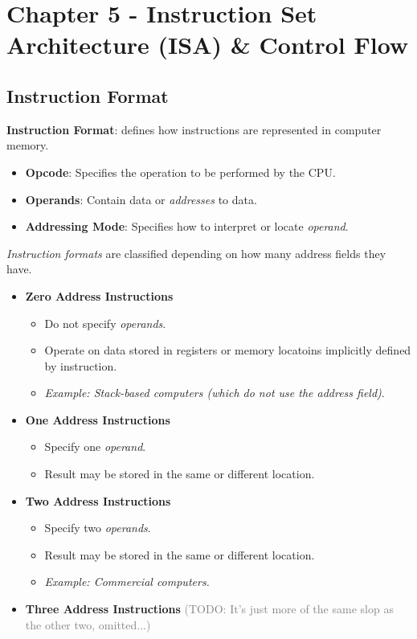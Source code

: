 \documentclass[12pt, letterpaper]{article}
\begin{document}

\section*{Chapter 5 - Instruction Set Architecture (ISA) \& Control Flow}

\subsection*{Instruction Format}

\textbf{Instruction Format}: defines how instructions are represented in computer memory.

\begin{itemize}
    \item \textbf{Opcode}: Specifies the operation to be performed by the CPU.
    \item \textbf{Operands}: Contain data or \textit{addresses} to data.
    \item \textbf{Addressing Mode}: Specifies how to interpret or locate \textit{operand}.
\end{itemize}

\textit{Instruction formats} are classified depending on how many address fields they have.

\begin{itemize}
    \item \textbf{Zero Address Instructions}
        \begin{itemize}
            \item Do not specify \textit{operands}.
            \item Operate on data stored in registers or memory locatoins implicitly defined by instruction.
            \item \textit{Example: Stack-based computers (which do not use the address field)}.
        \end{itemize}
    \item \textbf{One Address Instructions}
        \begin{itemize}
            \item Specify one \textit{operand}.
            \item Result may be stored in the same or different location.
        \end{itemize}
    \item \textbf{Two Address Instructions}
        \begin{itemize}
            \item Specify two \textit{operands}.
            \item Result may be stored in the same or different location.
            \item \textit{Example: Commercial computers.}
        \end{itemize}
    \item \textbf{Three Address Instructions} \textcolor{gray}{(TODO: It's just more of the same slop as the other two, omitted...)}
\end{itemize}
\end{document}
